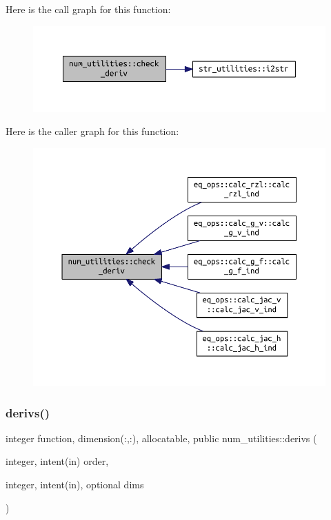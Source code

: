 Here is the call graph for this function\+:
\nopagebreak
\begin{figure}[H]
\begin{center}
\leavevmode
\includegraphics[width=350pt]{namespacenum__utilities_a00f4cfe18a734eaa5d66f529e52f7c31_cgraph}
\end{center}
\end{figure}
Here is the caller graph for this function\+:
\nopagebreak
\begin{figure}[H]
\begin{center}
\leavevmode
\includegraphics[width=350pt]{namespacenum__utilities_a00f4cfe18a734eaa5d66f529e52f7c31_icgraph}
\end{center}
\end{figure}
\mbox{\label{namespacenum__utilities_ac827c18dd05a9b5a06675eac942f3b51}} 
\subsubsection{\texorpdfstring{derivs()}{derivs()}}
{\footnotesize\ttfamily integer function, dimension(\+:,\+:), allocatable, public num\+\_\+utilities\+::derivs (\begin{DoxyParamCaption}\item[{integer, intent(in)}]{order,  }\item[{integer, intent(in), optional}]{dims }\end{DoxyParamCaption})}



